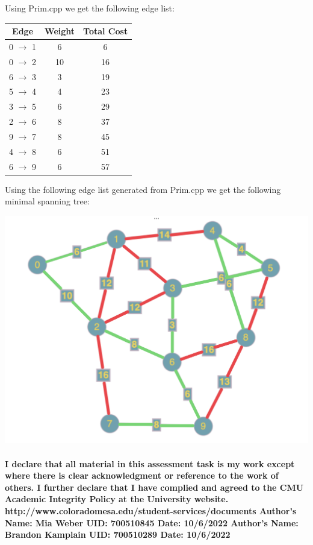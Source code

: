\documentclass{article}
\begin{document}
\noindent Using Prim.cpp we get the following edge list:

\begin{center}
\begin{tabular}{||c | c | c||} 
\hline
Edge & Weight & Total Cost \\ [0.5ex] 
\hline\hline
0 $\rightarrow$ 1 & 6 & 6 \\ 
\hline
0 $\rightarrow$ 2 & 10 & 16 \\
\hline
6 $\rightarrow$ 3 & 3 & 19 \\
\hline
5 $\rightarrow$ 4 & 4 & 23 \\
\hline
3 $\rightarrow$ 5 & 6 & 29 \\ 
\hline
2 $\rightarrow$ 6 & 8 & 37 \\ 
\hline
9 $\rightarrow$ 7 & 8 & 45 \\
\hline
4 $\rightarrow$ 8 & 6 & 51 \\
\hline
6 $\rightarrow$ 9 & 6 & 57 \\  [1ex] 
\hline
\end{tabular}
\end{center}

\noindent Using the following edge list generated from Prim.cpp we get the following minimal spanning tree:

\begin{center}
\includegraphics[width=\textwidth]{colorizedMST.jpeg}
\end{center}

\paragraph{\linebreak I declare that all material in this assessment task is my work except where there is clear acknowledgment or reference to the work of others. I further declare that I have complied and agreed to the CMU Academic Integrity Policy at the University website.
\linebreak  http://www.coloradomesa.edu/student-services/documents
\linebreak \linebreak Author’s Name: Mia Weber UID: 700510845 Date: 10/6/2022
\linebreak Author's Name: Brandon Kamplain UID: 700510289 Date: 10/6/2022}
\end{document}

